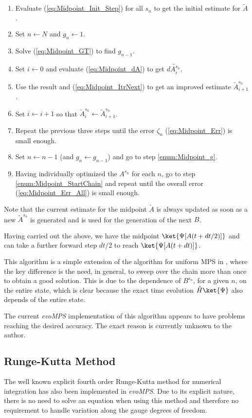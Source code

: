 \documentclass[a4paper,11pt]{article}
\begin{document}
\begin{enumerate} 
	\item Evaluate (\ref{eq:Midpoint_Init_Step}) for all $s_n$ to get the initial estimate for $\tilde{A}$.
	\item Set $n \leftarrow N$ and $g_n \leftarrow 1$. \label{enum:Midpoint_StartChain}
	\item Solve (\ref{eq:Midpoint_GT}) to find $g_{n - 1}$. \label{enum:Midpoint_g}
	\item Set $i \leftarrow 0$ and evaluate (\ref{eq:Midpoint_dA}) to get $d\tilde{A^{s_n}_i}$.
	\item Use the result and (\ref{eq:Midpoint_ItrNext}) to get an improved estimate $\tilde{A}^{s_n}_{i + 1}$.
	\item Set $i \leftarrow i + 1$ so that $\tilde{A}^{s_n}_i \leftarrow \tilde{A}^{s_n}_{i + 1}$.
	\item Repeat the previous three steps until the error $\zeta_n$ (\ref{eq:Midpoint_Err}) is small enough.
	\item Set $n \leftarrow n - 1$ (and $g_n \leftarrow g_{n-1}$) and go to step \ref{enum:Midpoint_g}.
	\item Having individually optimized the $A^{s_n}$ for each $n$, go to step 
		  \ref{enum:Midpoint_StartChain} and repeat until the overall error (\ref{eq:Midpoint_Err_All}) 
		  is small enough.
\end{enumerate}
Note that the current estimate for the midpoint $\tilde{A}$ is always updated as soon as a new $\tilde{A}^{s_n}$
is generated and is used for the generation of the next $B$.

Having carried out the above, we have the midpoint $\ket{\Psi[A(t + dt/2)]}$ and can take a further 
forward step $dt/2$ to reach $\ket{\Psi[A(t + dt)]}$.

This algorithm is a simple extension of the algorithm for uniform MPS in \cite{haegeman_time-dependent_2011},
where the key difference is the need, in general, to sweep over the chain more than once to obtain
a good solution. This is due to the dependence of $B^{s_n}$, for a given $n$, on the entire state, which
is clear because the exact time evolution $\hat{H} \ket{\Psi}$ also depends of the entire state.

The current \emph{evoMPS} implementation of this algorithm appears to have problems reaching the desired
accuracy. The exact reason is currently unknown to the author.

\subsection{Runge-Kutta Method}
The well known explicit fourth order Runge-Kutta method for numerical integration 
\cite{press_section_????} has
also been implemented in \emph{evoMPS}. Due to its explicit nature, there is no need to solve an equation
when using this method and therefore no requirement to handle variation along the
gauge degrees of freedom.
\end{document}
